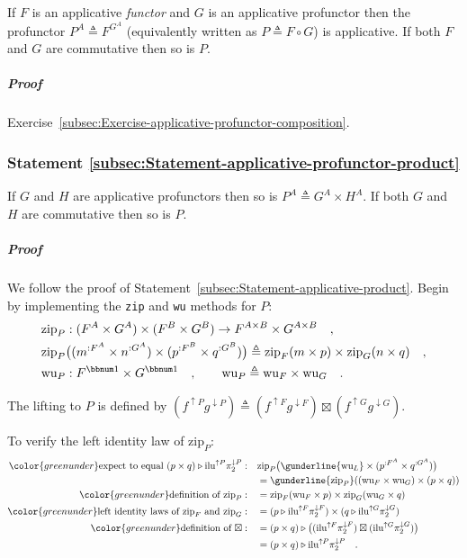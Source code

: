 If $F$ is an applicative \emph{functor} and $G$ is an applicative
profunctor then the profunctor $P^{A}\triangleq F^{G^{A}}$ (equivalently
written as $P\triangleq F\circ G$) is applicative. If both $F$ and
$G$ are commutative then so is $P$.

\subparagraph{Proof}

Exercise~\ref{subsec:Exercise-applicative-profunctor-composition}.

\subsubsection{Statement \label{subsec:Statement-applicative-profunctor-product}\ref{subsec:Statement-applicative-profunctor-product}}

If $G$ and $H$ are applicative profunctors then so is $P^{A}\triangleq G^{A}\times H^{A}$.
If both $G$ and $H$ are commutative then so is $P$.

\subparagraph{Proof}

We follow the proof of Statement~\ref{subsec:Statement-applicative-product}.
Begin by implementing the \lstinline!zip! and \lstinline!wu! methods
for $P$:
\begin{align*}
 & \text{zip}_{P}:(F^{A}\times G^{A})\times(F^{B}\times G^{B})\rightarrow F^{A\times B}\times G^{A\times B}\quad,\\
 & \text{zip}_{P}\big((m^{:F^{A}}\times n^{:G^{A}})\times(p^{:F^{B}}\times q^{:G^{B}})\big)\triangleq\text{zip}_{F}(m\times p)\times\text{zip}_{G}(n\times q)\quad,\\
 & \text{wu}_{P}:F^{\bbnum 1}\times G^{\bbnum 1}\quad,\quad\quad\text{wu}_{P}\triangleq\text{wu}_{F}\times\text{wu}_{G}\quad.
\end{align*}

The lifting to $P$ is defined by $(f^{\uparrow P}g^{\downarrow P})\triangleq(f^{\uparrow F}g^{\downarrow F})\boxtimes(f^{\uparrow G}g^{\downarrow G})$.

To verify the left identity law of $\text{zip}_{P}$:
\begin{align*}
{\color{greenunder}\text{expect to equal }(p\times q)\triangleright\text{ilu}^{\uparrow P}\pi_{2}^{\downarrow P}:}\quad & \text{zip}_{P}\big(\gunderline{\text{wu}_{L}}\times(p^{:F^{A}}\times q^{:G^{A}})\big)\\
 & =\gunderline{\text{zip}_{P}}((\text{wu}_{F}\times\text{wu}_{G})\times(p\times q))\\
{\color{greenunder}\text{definition of }\text{zip}_{P}:}\quad & =\text{zip}_{F}(\text{wu}_{F}\times p)\times\text{zip}_{G}(\text{wu}_{G}\times q)\\
{\color{greenunder}\text{left identity laws of }\text{zip}_{F}\text{ and }\text{zip}_{G}:}\quad & =(p\triangleright\text{ilu}^{\uparrow F}\pi_{2}^{\downarrow F})\times(q\triangleright\text{ilu}^{\uparrow G}\pi_{2}^{\downarrow G})\\
{\color{greenunder}\text{definition of }\boxtimes:}\quad & =(p\times q)\triangleright\big((\text{ilu}^{\uparrow F}\pi_{2}^{\downarrow F})\boxtimes(\text{ilu}^{\uparrow G}\pi_{2}^{\downarrow G})\big)\\
 & =(p\times q)\triangleright\text{ilu}^{\uparrow P}\pi_{2}^{\downarrow P}\quad.
\end{align*}

